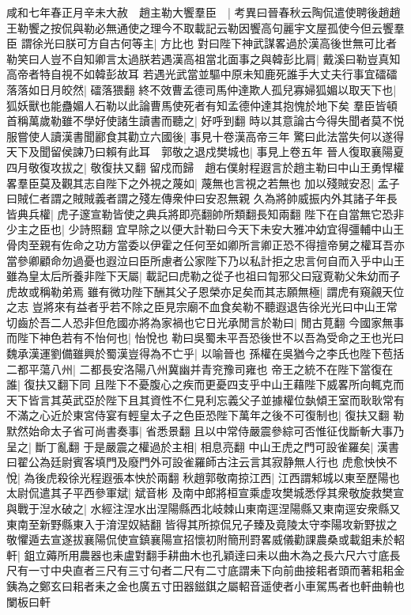 咸和七年春正月辛未大赦　趙主勒大饗羣臣　|{
	考異曰晉春秋云陶侃遣使聘後趙趙王勒饗之按侃與勒必無通使之理今不取載記云勒因饗高句麗宇文屋孤使今但云饗羣臣}
謂徐光曰朕可方自古何等主|{
	方比也}
對曰陛下神武謀畧過於漢高後世無可比者勒笑曰人豈不自知卿言太過朕若遇漢高祖當北面事之與韓彭比肩|{
	戴溪曰勒豈真知高帝者特自視不如韓彭故耳}
若遇光武當並驅中原未知鹿死誰手大丈夫行事宜礌礌落落如日月皎然|{
	礌落猥翻}
終不效曹孟德司馬仲達欺人孤兒寡婦狐媚以取天下也|{
	狐妖獸也能蠱媚人石勒以此論曹馬使死者有知孟德仲達其抱愧於地下矣}
羣臣皆頓首稱萬歲勒雖不學好使諸生讀書而聽之|{
	好呼到翻}
時以其意論古今得失聞者莫不悦服嘗使人讀漢書聞酈食其勸立六國後|{
	事見十卷漢高帝三年}
驚曰此法當失何以遂得天下及聞留侯諫乃曰賴有此耳　郭敬之退戍樊城也|{
	事見上卷五年}
晉人復取襄陽夏四月敬復攻拔之|{
	敬復扶又翻}
留戍而歸　趙右僕射程遐言於趙主勒曰中山王勇悍權畧羣臣莫及觀其志自陛下之外視之蔑如|{
	蔑無也言視之若無也}
加以殘賊安忍|{
	孟子曰賊仁者謂之賊賊義者謂之殘左傳衆仲曰安忍無親}
久為將帥威振内外其諸子年長皆典兵權|{
	虎子邃宣勒皆使之典兵將即亮翻帥所類翻長知兩翻}
陛下在自當無它恐非少主之臣也|{
	少詩照翻}
宜早除之以便大計勒曰今天下未安大雅冲幼宜得彊輔中山王骨肉至親有佐命之功方當委以伊霍之任何至如卿所言卿正恐不得擅帝舅之權耳吾亦當參卿顧命勿過憂也遐泣曰臣所慮者公家陛下乃以私計拒之忠言何自而入乎中山王雖為皇太后所養非陛下天屬|{
	載記曰虎勒之從子也祖曰㔨邪父曰寇覔勒父朱幼而子虎故或稱勒弟焉}
雖有微功陛下酬其父子恩榮亦足矣而其志願無極|{
	謂虎有窺覦天位之志}
豈將來有益者乎若不除之臣見宗廟不血食矣勒不聽遐退告徐光光曰中山王常切齒於吾二人恐非但危國亦將為家禍也它日光承閒言於勒曰|{
	閒古莧翻}
今國家無事而陛下神色若有不怡何也|{
	怡悅也}
勒曰吳蜀未平吾恐後世不以吾為受命之王也光曰魏承漢運劉備雖興於蜀漢豈得為不亡乎|{
	以喻晉也}
孫權在吳猶今之李氏也陛下苞括二都平蕩八州|{
	二都長安洛陽八州冀幽并青兖豫司雍也}
帝王之統不在陛下當復在誰|{
	復扶又翻下同}
且陛下不憂腹心之疾而更憂四支乎中山王藉陛下威畧所向輒克而天下皆言其英武亞於陛下且其資性不仁見利忘義父子並據權位埶傾王室而耿耿常有不滿之心近於東宮侍宴有輕皇太子之色臣恐陛下萬年之後不可復制也|{
	復扶又翻}
勒默然始命太子省可尚書奏事|{
	省悉景翻}
且以中常侍嚴震參綜可否惟征伐斷斬大事乃呈之|{
	斷丁亂翻}
于是嚴震之權過於主相|{
	相息亮翻}
中山王虎之門可設雀羅矣|{
	漢書曰翟公為廷尉賓客填門及廢門外可設雀羅師古注云言其寂静無人行也}
虎愈怏怏不悅|{
	為後虎殺徐光程遐張本怏於兩翻}
秋趙郭敬南掠江西|{
	江西謂邾城以東至歷陽也}
太尉侃遣其子平西參軍斌|{
	斌音彬}
及南中郎將桓宣乘虚攻樊城悉俘其衆敬旋救樊宣與戰于湼水破之|{
	水經注涅水出涅陽縣西北岐棘山東南逕涅陽縣又東南逕安衆縣又東南至新野縣東入于淯涅奴結翻}
皆得其所掠侃兄子臻及竟陵太守李陽攻新野拔之敬懼遁去宣遂拔襄陽侃使宣鎮襄陽宣招懷初附簡刑罸畧威儀勸課農桑或載鉏耒於軺軒|{
	鉏立薅所用農器也耒盧對翻手耕曲木也孔穎逹曰耒以曲木為之長六尺六寸底長尺有一寸中央直者三尺有三寸句者二尺有二寸底謂耒下向前曲接耜者頭而著耜耜金銕為之鄭玄曰耜者耒之金也廣五寸田器鎡錤之屬軺音遥使者小車駕馬者也軒曲輈也闌板曰軒}
